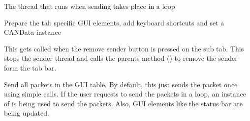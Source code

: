 \documentclass[letterpaper,10pt,english]{sphinxmanual}
\begin{document}
\begin{fulllineitems}
\begin{fulllineitems}
\begin{quote}
\begin{description}
\end{description}\end{quote}

\end{fulllineitems}


\begin{fulllineitems}
\label{\detokenize{src:src.SenderTabElement.SenderTabElement.loopSenderThread}}
The thread that runs when sending takes place in a loop

\end{fulllineitems}


\begin{fulllineitems}
\label{\detokenize{src:src.SenderTabElement.SenderTabElement.prepareUI}}
Prepare the tab specific GUI elements, add keyboard shortcuts and set a CANData instance

\end{fulllineitems}


\begin{fulllineitems}
\label{\detokenize{src:src.SenderTabElement.SenderTabElement.removeSender}}
This gets called when the remove sender button is pressed on the sub tab.
This stops the sender thread and calls the parents method ({\hyperref[\detokenize{src:src.SenderTab.SenderTab.removeSender}]{}})
to remove the sender form the tab bar.

\end{fulllineitems}


\begin{fulllineitems}
\label{\detokenize{src:src.SenderTabElement.SenderTabElement.sendAll}}
Send all packets in the GUI table. By default, this just sends the packet once using simple calls.
If the user requests to send the packets in a loop, an instance of {\hyperref[\detokenize{src:src.SenderThread.LoopSenderThread}]{}}
is being used to send the packets.
Also, GUI elements like the status bar are being updated.


\end{fulllineitems}
\end{fulllineitems}
\end{document}
